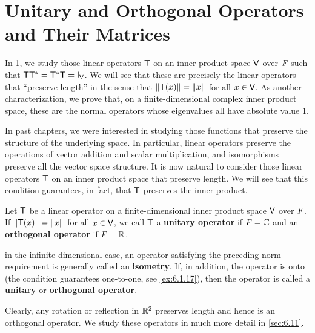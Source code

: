 \section{Unitary and Orthogonal Operators and Their Matrices}\label{sec:6.5}

\begin{note}
	In \cref{sec:6.5}, we study those linear operators \(\mathsf{T}\) on an inner product space \(\mathsf{V}\) over \(\mathit{F}\) such that \(\T \T^* = \T^* \T = \IT[\V]\).
	We will see that these are precisely the linear operators that ``preserve length'' in the sense that \(\left\lVert\mathsf{T}(x)\right\rVert = \left\lVert x\right\rVert\) for all \(x \in \mathsf{V}\).
	As another characterization, we prove that, on a finite-dimensional complex inner product space, these are the normal operators whose eigenvalues all have absolute value \(1\).

	In past chapters, we were interested in studying those functions that preserve the structure of the underlying space.
	In particular, linear operators preserve the operations of vector addition and scalar multiplication, and isomorphisms preserve all the vector space structure.
	It is now natural to consider those linear operators \(\mathsf{T}\) on an inner product space that preserve length.
	We will see that this condition guarantees, in fact, that \(\mathsf{T}\) preserves the inner product.
\end{note}

\begin{defn}\label{6.5.1}
	Let \(\mathsf{T}\) be a linear operator on a finite-dimensional inner product space \(\mathsf{V}\) over \(\mathit{F}\).
	If \(\left\lVert\mathsf{T}(x)\right\rVert = \left\lVert x\right\rVert\) for all \(x \in \mathsf{V}\), we call \(\mathsf{T}\) a \textbf{unitary operator} if \(\mathit{F} = \mathbb{C}\) and an \textbf{orthogonal operator} if \(\mathit{F} = \mathbb{R}\).

	in the infinite-dimensional case, an operator satisfying the preceding norm requirement is generally called an \textbf{isometry}.
	If, in addition, the operator is onto (the condition guarantees one-to-one, see \cref{ex:6.1.17}), then the operator is called a \textbf{unitary} or \textbf{orthogonal operator}.
\end{defn}

\begin{note}
	Clearly, any rotation or reflection in \(\mathbb{R}^2\) preserves length and hence is an orthogonal operator.
	We study these operators in much more detail in \cref{sec:6.11}.
\end{note}

